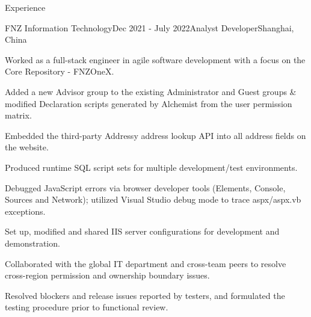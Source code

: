 \documentclass{resume} %
\begin{document}
\begin{rSection}{Experience}
    \begin{rSubsection}{FNZ Information Technology}{Dec 2021 - July 2022}{Analyst Developer}{Shanghai, China}
        \item Worked as a full-stack engineer in agile software development with a focus on the Core Repository - FNZOneX.
        \item Added a new Advisor group to the existing Administrator and Guest groups \& modified Declaration scripts generated by Alchemist from the user permission matrix.
        \item Embedded the third-party Addressy address lookup API into all address fields on the website.
        \item Produced runtime SQL script sets for multiple development/test environments.
        \item Debugged JavaScript errors via browser developer tools (Elements, Console, Sources and Network); utilized Visual Studio debug mode to trace aspx/aspx.vb exceptions.
        \item Set up, modified and shared IIS server configurations for development and demonstration.
        \item Collaborated with the global IT department and cross-team peers to resolve cross-region permission and ownership boundary issues.
        \item Resolved blockers and release issues reported by testers, and formulated the testing procedure prior to functional review.
    \end{rSubsection}


\end{rSection}
\end{document}
